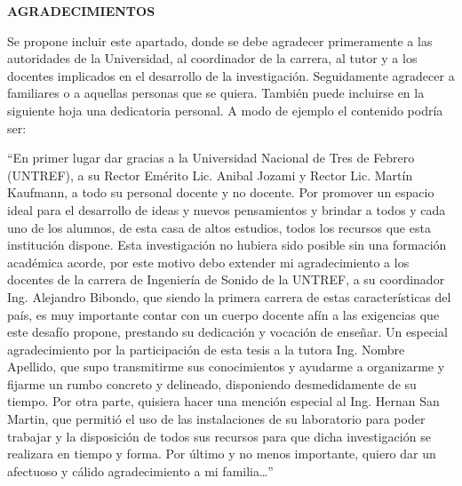 \begin{centering}
\Large{\textbf{AGRADECIMIENTOS}}

\end{centering}

Se propone incluir este apartado, donde se debe agradecer primeramente a las autoridades de la Universidad, al coordinador de la carrera, al tutor y a los docentes implicados en el desarrollo de la investigación. Seguidamente agradecer a familiares o a aquellas personas que se quiera. También puede incluirse en la siguiente hoja una dedicatoria personal. A modo de ejemplo el contenido podría ser:

“En primer lugar dar gracias a la Universidad Nacional de Tres de Febrero (UNTREF), a su Rector Emérito Lic. Anibal Jozami y Rector Lic. Martín Kaufmann, a todo su personal docente y no docente. Por promover un espacio ideal para el desarrollo de ideas y nuevos pensamientos y brindar a todos y cada uno de los alumnos, de esta casa de altos estudios, todos los recursos que esta institución dispone.   
Esta investigación no hubiera sido posible sin una formación académica acorde, por este motivo debo extender mi agradecimiento a los docentes de la carrera de Ingeniería de Sonido de la UNTREF, a su coordinador Ing. Alejandro Bibondo, que siendo la primera carrera de estas características del país, es muy importante contar con un cuerpo docente afín a las exigencias que este desafío propone, prestando su dedicación y vocación de enseñar. 
Un especial agradecimiento por la participación de esta tesis a la tutora Ing. Nombre Apellido, que supo transmitirme sus conocimientos y ayudarme a organizarme y fijarme un rumbo concreto y delineado, disponiendo desmedidamente de su tiempo. 
Por otra parte, quisiera hacer una mención especial al Ing. Hernan San Martin, que permitió el uso de las instalaciones de su laboratorio para poder trabajar y la disposición de todos sus recursos para que dicha investigación se realizara en tiempo y forma. 
Por último y no menos importante, quiero dar un afectuoso y cálido agradecimiento a mi familia…”


\newpage
